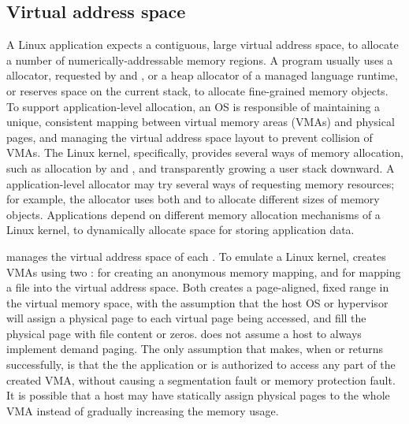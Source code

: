 \subsection{Virtual address space}
\label{sec:libos:vma}


A Linux application expects a contiguous, large virtual address space,
to allocate a number of numerically-addressable memory regions.
A program usually uses a \libc{} allocator, requested by  and ,
or a heap allocator of a managed language runtime,
or reserves space on the current stack,
to allocate fine-grained memory objects.
To support application-level allocation,
an OS is responsible of
maintaining a unique, consistent mapping between virtual memory areas (VMAs) and physical pages,
and managing the virtual address space layout
to prevent collision of VMAs.
The Linux kernel, specifically, provides several ways of memory allocation, such as allocation by  and ,
and transparently growing a user stack downward. %
A application-level allocator may try several ways of requesting memory resources;
for example, the \glibc{} allocator
uses both  and  to allocate different sizes of memory objects.
Applications depend on different memory allocation mechanisms
of a Linux kernel,
to dynamically allocate space for storing application data.
 



\thelibos{} manages the virtual address space of each \picoproc{}.
To emulate a Linux kernel,
\thelibos{} creates VMAs using two \hostapis{}:
 for creating an anonymous memory mapping,
and  for mapping a file into the virtual address space.
Both \hostapis{} creates a page-aligned, fixed range in the
virtual memory space,
with the assumption that the host OS or hypervisor
will assign a physical page to each virtual page being accessed,
and fill the physical page with file content or zeros.
\thelibos{} does not assume
a host to always implement demand paging.
The only assumption that \thelibos{} makes, when  or  returns successfully,
is that 
the the application or 
\thelibos{} is authorized to access any part of the created VMA,
without causing a segmentation fault
or memory protection fault.
It is possible that a host may have statically assign
physical pages to the whole VMA instead of gradually increasing the memory usage.


